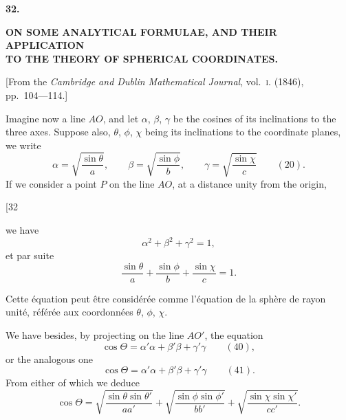 \documentclass[11pt,a4paper]{book}
\begin{document}

\newpage
{}
\setcounter{page}{217}

\begin{center}
{\large\bfseries 32.}
\end{center}
\vspace{0.5em}
\begin{center}
{\large\bfseries ON SOME ANALYTICAL FORMULAE, AND THEIR APPLICATION\\[0.3em]
TO THE THEORY OF SPHERICAL COORDINATES.}
\end{center}
\vspace{0.5em}
\begin{center}
{[From the \textit{Cambridge and Dublin Mathematical Journal}, vol.~\textsc{i}. (1846),\\
pp.~104---114.]}
\end{center}
\vspace{1em}

Imagine now a line $AO$, and let $\alpha$, $\beta$, $\gamma$ be the cosines of its inclinations to the
three axes. Suppose also, $\theta$, $\phi$, $\chi$ being its inclinations to the coordinate planes,
we write
\[
\alpha = \sqrt{\frac{\sin\theta}{a}}, \qquad \beta = \sqrt{\frac{\sin\phi}{b}}, \qquad \gamma = \sqrt{\frac{\sin\chi}{c}} \qquad (20).
\]
If we consider a point $P$ on the line $AO$, at a distance unity from the origin,

\newpage
\setcounter{page}{218}

\begin{center}
{\small [32}
\end{center}
\vspace{-1em}

we have
\[
\alpha^2 + \beta^2 + \gamma^2 = 1,
\]
et par suite
\[
\frac{\sin\theta}{a} + \frac{\sin\phi}{b} + \frac{\sin\chi}{c} = 1.
\]

Cette \'{e}quation peut \^{e}tre consid\'{e}r\'{e}e comme l'\'{e}quation de la sph\`{e}re de rayon unit\'{e},
r\'{e}f\'{e}r\'{e}e aux coordonn\'{e}es $\theta$, $\phi$, $\chi$.

\newpage
\setcounter{page}{219}

We have besides, by projecting on the line $AO'$, the equation
\[
\cos\Theta = \alpha'\alpha + \beta'\beta + \gamma'\gamma \qquad (40),
\]
or the analogous one
\[
\cos\Theta = \alpha'\alpha + \beta'\beta + \gamma'\gamma \qquad (41).
\]
From either of which we deduce
\[
\cos\Theta = \sqrt{\frac{\sin\theta \sin\theta'}{aa'}} + \sqrt{\frac{\sin\phi \sin\phi'}{bb'}} + \sqrt{\frac{\sin\chi \sin\chi'}{cc'}}.
\]
\end{document}
